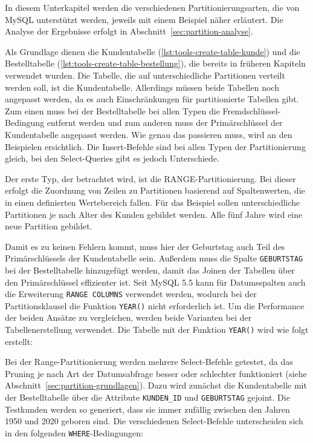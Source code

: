 In diesem Unterkapitel werden die verschiedenen Partitionierungsarten, die von MySQL unterstützt werden, jeweils mit einem Beispiel näher erläutert.
Die Analyse der Ergebnisse erfolgt in Abschnitt~\ref{sec:partition-analyse}.

Als Grundlage dienen die Kundentabelle (\ref{lst:tools-create-table-kunde}) und die Bestelltabelle (\ref{lst:tools-create-table-bestellung}), die bereits in früheren Kapiteln verwendet wurden.
Die Tabelle, die auf unterschiedliche Partitionen verteilt werden soll, ist die Kundentabelle.
Allerdings müssen beide Tabellen noch angepasst werden, da es auch Einschränkungen für partitionierte Tabellen gibt.
Zum einen muss bei der Bestelltabelle bei allen Typen die Fremdschlüssel-Bedingung entfernt werden und zum anderen muss der Primärschlüssel der Kundentabelle angepasst werden.
Wie genau das passieren muss, wird an den Beispielen ersichtlich.
Die Insert-Befehle sind bei allen Typen der Partitionierung gleich, bei den Select-Queries gibt es jedoch Unterschiede.

Der erste Typ, der betrachtet wird, ist die RANGE-Partitionierung.
Bei dieser erfolgt die Zuordnung von Zeilen zu Partitionen basierend auf Spaltenwerten, die in einen definierten Wertebereich fallen.
Für das Beispiel sollen unterschiedliche Partitionen je nach Alter des Kunden gebildet werden.
Alle fünf Jahre wird eine neue Partition gebildet.

Damit es zu keinen Fehlern kommt, muss hier der Geburtstag auch Teil des Primärschlüssels der Kundentabelle sein.
Außerdem muss die Spalte \texttt{GEBURTSTAG} bei der Bestelltabelle hinzugefügt werden, damit das Joinen der Tabellen über den Primärschlüssel effizienter ist.
Seit MySQL 5.5 kann für Datumsspalten auch die Erweiterung \texttt{RANGE COLUMNS} verwendet werden, wodurch bei der Partitionsklausel die Funktion \texttt{YEAR()} nicht erforderlich ist.
Um die Performance der beiden Ansätze zu vergleichen, werden beide Varianten bei der Tabellenerstellung verwendet.
Die Tabelle mit der Funktion \texttt{YEAR()} wird wie folgt erstellt:


\vspace{-5pt}

Bei der Range-Partitionierung werden mehrere Select-Befehle getestet, da das Pruning je nach Art der Datumsabfrage besser oder schlechter funktioniert (siehe Abschnitt~\ref{sec:partition-grundlagen}).
Dazu wird zunächst die Kundentabelle mit der Bestelltabelle über die Attribute \texttt{KUNDEN\_ID} und \texttt{GEBURTSTAG} gejoint.
Die Testkunden werden so generiert, dass sie immer zufällig zwischen den Jahren 1950 und 2020 geboren sind.
Die verschiedenen Select-Befehle unterscheiden sich in den folgenden \texttt{WHERE}-Bedingungen:

